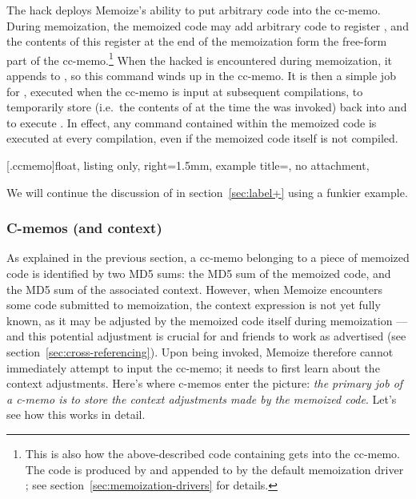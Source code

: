 \documentclass[a4paper,11pt]{article}
\def\exampledir{examples/}
\begin{document}
The  hack deploys Memoize's ability to put arbitrary code into the
cc-memo.  During memoization, the memoized code may add arbitrary code to
register , and the contents of this register at the end of
the memoization form the free-form part of the cc-memo.\footnote{This is also
  how the above-described code containing  gets into
  the cc-memo.  The code is produced by  and appended
  to  by the default memoization driver
  ; see section~\ref{sec:memoization-drivers} for
  details.}  When the hacked  is encountered during memoization, it
appends  to
, so this command winds up in the cc-memo.  It is then a
simple job for , executed when the cc-memo is input at
subsequent compilations, to temporarily store  (i.e.\
the contents of  at the time the  was invoked) back
into \cs{@currentlabel} and to execute \cs{label}\marg{label name}.  In effect, any
\cs{label} command contained within the memoized code is executed at every
compilation, even if the memoized code itself is not compiled.

\begingroup

[.ccmemo]{float,
  listing only, right=1.5mm,
  example title=\mymemo,
  no attachment,
}
\endgroup

We will continue the discussion of  in section~\ref{sec:label+} using
a funkier example.


\subsubsection{C-memos (and context)}
\label{sec:c-memos}

As explained in the previous section, a cc-memo belonging to a piece of
memoized code is identified by two MD5 sums: the MD5 sum of the memoized code,
and the MD5 sum of the associated context.  However, when Memoize encounters
some code submitted to memoization, the context expression is not yet fully
known, as it may be adjusted by the memoized code itself during memoization ---
and this potential adjustment is crucial for \cs{ref} and friends to work as
advertised (see section~\ref{sec:cross-referencing}).  Upon being invoked,
Memoize therefore cannot immediately attempt to input the cc-memo; it needs to
first learn about the context adjustments.  Here's where c-memos enter the
picture: \emph{the primary job of a c-memo is to store the context adjustments
  made by the memoized code}.  Let's see how this works in detail.
\end{document}
